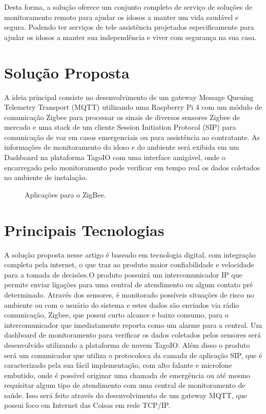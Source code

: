 \documentclass{acm_proc_article-sp}
\newcommand{\fig}[4][htb]{
  \begin{figure}[#1]
    {\centering{\texttt{[image: fig/\#2]}}\par}
    \caption{#3}
    \label{fig:#2}
  \end{figure}
}
\begin{document}
Desta forma, a solução oferece um conjunto completo de serviço de soluções de monitoramento remoto para ajudar os idosos a manter um vida saudável e segura. Podendo ter serviços de tele assistência projetados especificamente para ajudar os idosos a manter sua independência e viver com segurança na sua casa.

\section{Solução Proposta}

A ideia principal consiste
no desenvolvimento de um gateway Message Queuing Telemetry Transport (MQTT)
utilizando uma Raspberry Pi 4 com um módulo de comunicação Zigbee para processar os
sinais de diversos sensores Zigbee de mercado e uma stack de um cliente Session Initiation
Protocol (SIP) para comunicação de voz em casos emergenciais ou para assistência ao
contratante. As informações de monitoramento do idoso e do ambiente será exibida em um
Dashboard na plataforma TagoIO com uma interface amigável, onde o encarregado pelo
monitoramento pode verificar em tempo real os dados coletados no ambiente de instalação.

\fig{zigbee}{Aplicações para o ZigBee.}{width=0.8\columnwidth}

\section{Principais Tecnologias}

A solução proposta nesse artigo é baseado em tecnologia digital, com integração
completa pela internet, o que traz ao produto maior confiabilidade e velocidade para
a tomada de decisões.O produto possuirá um intercomunicador
IP que permite enviar ligações para uma central de atendimento ou algum contato pré
determinado. Através dos sensores, é monitorado possíveis situações de risco no ambiente
ou com o usuário do sistema e estes dados são enviados via rádio comunicação, Zigbee, que possui curto alcance e baixo consumo, para o intercomunicador que imediatamente reporta como um alarme para a central. Um dashboard de
monitoramento para verificar os dados coletados pelos sensores será desenvolvido utilizando
a plataforma de nuvem TagoIO.
Além disso o produto será um comunicador que utiliza o protocoloca da camada de aplicação SIP, que é caracterizado pela sua fácil implementação, com alto falante e
microfone embutido, onde é possível originar uma chamada de emergência ou até mesmo
requisitar algum tipo de atendimento com uma central de monitoramento de saúde. Isso será feito através do desenvolvimento de um gateway MQTT, que possui foco em Internet das Coisas em rede TCP/IP.
\end{document}
